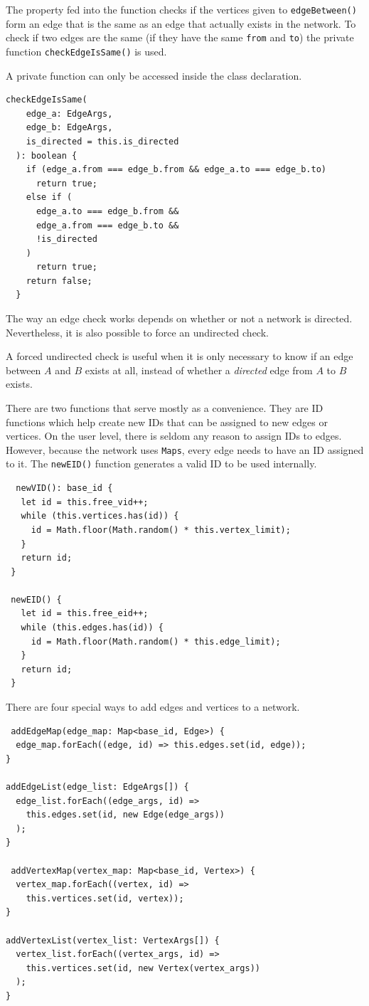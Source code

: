The property fed into the function checks if the vertices given to \texttt{edgeBetween()}
form an edge that is the same as an edge that actually exists in the network.
To check if two edges are the same
(if they have the same \texttt{from} and \texttt{to})
the private function \texttt{checkEdgeIsSame()} is used.

A private function can only be accessed inside the class declaration.

\begin{verbatim}
checkEdgeIsSame(
    edge_a: EdgeArgs,
    edge_b: EdgeArgs,
    is_directed = this.is_directed
  ): boolean {
    if (edge_a.from === edge_b.from && edge_a.to === edge_b.to)
      return true;
    else if (
      edge_a.to === edge_b.from &&
      edge_a.from === edge_b.to &&
      !is_directed
    )
      return true;
    return false;
  }
\end{verbatim}

The way an edge check works depends on whether or not a network is directed.
Nevertheless, it is also possible to force an undirected check.

A forced undirected check is useful when it is only necessary to know
if an edge between $A$ and $B$ exists at all, 
instead of whether a \textit{directed} edge from $A$ to $B$ exists.

There are two functions that serve mostly as a convenience.
They are ID functions which help create new IDs that can be assigned to new edges or vertices.
On the user level, there is seldom any reason to assign IDs to edges.
However, because the network uses \texttt{Maps}, every edge needs to have
an ID assigned to it.
The \texttt{newEID()} function generates a valid ID to be used internally.

\begin{verbatim}
  newVID(): base_id {
   let id = this.free_vid++;
   while (this.vertices.has(id)) {
     id = Math.floor(Math.random() * this.vertex_limit);
   }
   return id;
 }
 
 newEID() {
   let id = this.free_eid++;
   while (this.edges.has(id)) {
     id = Math.floor(Math.random() * this.edge_limit);
   }
   return id;
 }
\end{verbatim}

There are four special ways to add edges and vertices to a network.

\begin{verbatim}
 addEdgeMap(edge_map: Map<base_id, Edge>) {
  edge_map.forEach((edge, id) => this.edges.set(id, edge));
}

addEdgeList(edge_list: EdgeArgs[]) {
  edge_list.forEach((edge_args, id) =>
    this.edges.set(id, new Edge(edge_args))
  );
}

 addVertexMap(vertex_map: Map<base_id, Vertex>) {
  vertex_map.forEach((vertex, id) =>
    this.vertices.set(id, vertex));
}

addVertexList(vertex_list: VertexArgs[]) {
  vertex_list.forEach((vertex_args, id) =>
    this.vertices.set(id, new Vertex(vertex_args))
  );
}
\end{verbatim}

